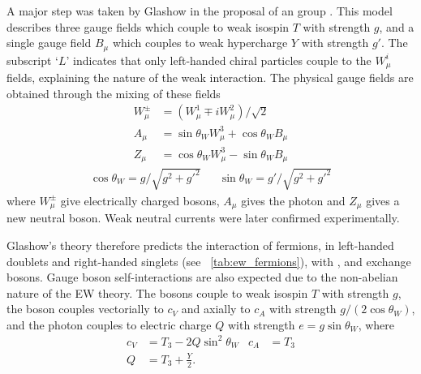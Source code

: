 A major step was taken by Glashow in the proposal of an \EWgroup group 
\cite{Glashow:1961}. This model describes three gauge fields 
 which couple to weak isospin $T$ with 
strength $g$, and a single gauge field $B_{\mu}$ which couples to weak hypercharge $Y$ 
with strength $g'$. The subscript `$L$' indicates that only left-handed chiral particles 
couple to the $W^i_{\mu}$ fields, explaining the \VminusA nature of the weak interaction. 
The physical gauge fields are obtained through the mixing of these fields
\begin{align}
	W^{\pm}_{\mu} &= (W^1_{\mu} \mp i W^2_{\mu}) / \sqrt{2} \label{eq:Wfield} \\
	A_{\mu} &= \sin\theta_W W^3_{\mu} + \cos\theta_W B_{\mu} \label{eq:Afield} \\
	Z_{\mu} &= \cos\theta_W W^3_{\mu} - \sin\theta_W B_{\mu} \label{eq:Zfield}
\end{align}
\begin{align}
	\cos\theta_W = g/\sqrt{g^2 + g'^2} && \sin\theta_W = g'/\sqrt{g^2 + g'^2} \label{eq:weak_mixing}
\end{align}
where $W^{\pm}_{\mu}$ give electrically charged \PWpm bosons, $A_{\mu}$ gives the photon 
and $Z_{\mu}$ gives a new neutral \PZ boson. Weak neutral currents were later confirmed 
experimentally. 

Glashow's \EWgroup theory therefore predicts the interaction of fermions, in left-handed 
 doublets and right-handed  singlets (see 
\Table~\ref{tab:ew_fermions}), with \PWpm, \PZ and \Pphoton 
exchange bosons. Gauge boson self-interactions are also expected due to the non-abelian 
nature of the \ac{EW} theory. The \PWpm bosons couple to weak isospin $T$ with strength 
$g$, the \PZ boson couples vectorially to $c_V$ and axially to $c_A$ with strength 
$g/(2\cos\theta_W)$, and the photon couples to electric charge $Q$ with strength 
$e = g\sin\theta_W$, where
\begin{align}
	c_V &= T_3 - 2 Q \sin^2\theta_W & c_A &= T_3 \\
	Q   &= T_3 + \frac{Y}{2}.
\end{align}

